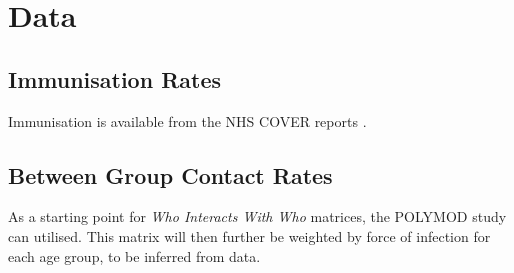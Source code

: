 \documentclass{article}
\theoremstyle{definition}
\begin{document}
\section{Data}
\subsection{Immunisation Rates}
Immunisation is available from the NHS COVER reports \cite{noauthor_childhood_nodate}.
\subsection{Between Group Contact Rates}
As a starting point for \emph{Who Interacts With Who} matrices, the POLYMOD study \cite{mossong_social_2008} can utilised. This matrix will then further be weighted by force of infection for each age group, to be inferred from data.
\end{document}
